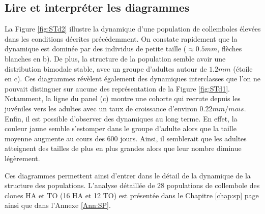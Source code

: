 \subsection{Lire et interpréter les diagrammes}

La Figure \ref{fig:STd2} illustre la dynamique d'une population de
collemboles élevées dans les conditions décrites précédemment. On constate
rapidement que la dynamique est dominée par des individus de petite taille
($\approx 0.5mm$, flèches blanches en b). De plus, la structure de la population
semble avoir une distribution bimodale stable, avec un groupe d'adultes autour
de $1.2mm$ (étoile en c). Ces diagrammes révèlent également des dynamiques
interclasses que l'on ne pouvait distinguer sur aucune des représentation de la
Figure \ref{fig:STd1}. Notamment, la ligne du panel (c) montre une cohorte qui
recrute depuis les juvéniles vers les adultes avec un taux de croissance
d'environ $0.22 mm/mois$. Enfin, il est possible d'observer des dynamiques au
long terme. En effet, la couleur jaune semble s'estomper dans le groupe d'adulte
alors que la taille moyenne augmente au cours des $600$ jours. Ainsi, il
semblerait que les adultes atteignent des tailles de plus en plus grandes alors
que leur nombre diminue légèrement. 

Ces diagrammes permettent ainsi d'entrer dans le détail de la dynamique de la
structure des populations. L'analyse détaillée de 28 populations de collembole des clones HA
et TO (16 HA et 12 TO) est présentée dans le Chapitre \ref{chap:sp} page
\pageref{chap:sp} ainsi que dans l'Annexe \ref{Ann:SP}.



